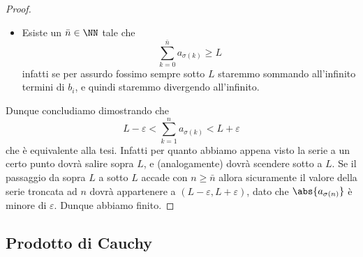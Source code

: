 \documentclass[11pt]{scrartcl}
\begin{document}
\begin{proof}
\begin{itemize}
			$$\abs{a_{\sigma(n)}}<\varepsilon$$
			infatti, noi sappiamo che per ogni $m\in\NN$ esiste un $k\in\NN$ tale che per ogni $n\ge k$ vale 
			$$\sigma(n)>m$$
			quindi definitivamente $\sigma(n)$ è maggiore del valore oltre il quale la successione $a_n$ appartiene definitivamente ad $(-\varepsilon,\varepsilon)$. 
			\item Esiste un $\bar{n}\in \NN$ tale che 
			$$\sum_{k=0}^{\bar{n}}a_{\sigma(k)}\ge L$$
			infatti se per assurdo fossimo sempre sotto $L$ staremmo sommando all'infinito termini di $b_i$, e quindi staremmo divergendo all'infinito.
		\end{itemize} 
		Dunque concludiamo dimostrando che
		$$L-\varepsilon<\sum_{k=1}^na_{\sigma(k)}<L+\varepsilon$$
		che è equivalente alla tesi. Infatti per quanto abbiamo appena visto la serie a un certo punto dovrà salire sopra $L$, e (analogamente) dovrà scendere sotto a $L$. Se il passaggio da sopra $L$ a sotto $L$ accade con $n\ge \bar{n}$ allora sicuramente il valore della serie troncata ad $n$ dovrà appartenere a $(L-\varepsilon,L+\varepsilon)$, dato che $\abs{a_{\sigma(n)}}$ è minore di $\varepsilon$. Dunque abbiamo finito.
	\end{proof}
	
	\subsection{Prodotto di Cauchy}
	
\end{document}
